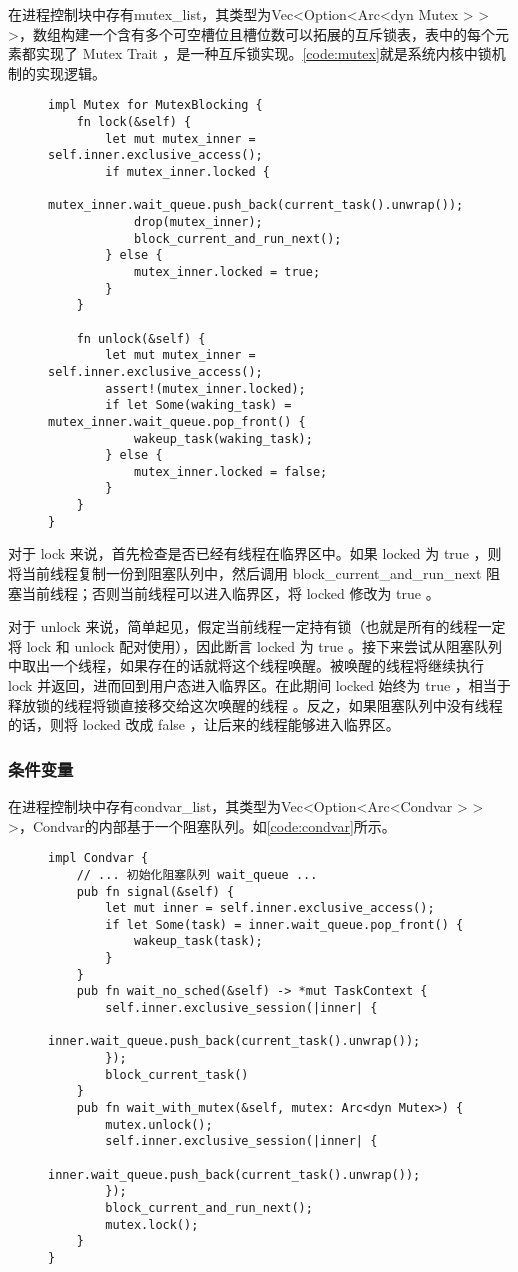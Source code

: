 在进程控制块中存有mutex\_list，其类型为Vec<Option<Arc<dyn Mutex > > >，数组构建一个含有多个可空槽位且槽位数可以拓展的互斥锁表，表中的每个元素都实现了 Mutex Trait ，是一种互斥锁实现。\autoref{code:mutex}就是系统内核中锁机制的实现逻辑。
\begin{figure}[h]
\begin{lstlisting}[caption=互斥锁的实现,label=code:mutex]
impl Mutex for MutexBlocking {
    fn lock(&self) {
        let mut mutex_inner = self.inner.exclusive_access();
        if mutex_inner.locked {
            mutex_inner.wait_queue.push_back(current_task().unwrap());
            drop(mutex_inner);
            block_current_and_run_next();
        } else {
            mutex_inner.locked = true;
        }
    }

    fn unlock(&self) {
        let mut mutex_inner = self.inner.exclusive_access();
        assert!(mutex_inner.locked);
        if let Some(waking_task) = mutex_inner.wait_queue.pop_front() {
            wakeup_task(waking_task);
        } else {
            mutex_inner.locked = false;
        }
    }
}
\end{lstlisting}
\end{figure}

对于 lock 来说，首先检查是否已经有线程在临界区中。如果 locked 为 true ，则将当前线程复制一份到阻塞队列中，然后调用 block\_current\_and\_run\_next 阻塞当前线程；否则当前线程可以进入临界区，将 locked 修改为 true 。

对于 unlock 来说，简单起见，假定当前线程一定持有锁（也就是所有的线程一定将 lock 和 unlock 配对使用），因此断言 locked 为 true 。接下来尝试从阻塞队列中取出一个线程，如果存在的话就将这个线程唤醒。被唤醒的线程将继续执行 lock 并返回，进而回到用户态进入临界区。在此期间 locked 始终为 true ，相当于 释放锁的线程将锁直接移交给这次唤醒的线程 。反之，如果阻塞队列中没有线程的话，则将 locked 改成 false ，让后来的线程能够进入临界区。


\subsubsection{条件变量}

在进程控制块中存有condvar\_list，其类型为Vec<Option<Arc<Condvar > > >，Condvar的内部基于一个阻塞队列。如\autoref{code:condvar}所示。
\begin{figure}[h]
\begin{lstlisting}[caption=条件变量的实现, label=code:condvar]
impl Condvar {
    // ... 初始化阻塞队列 wait_queue ...
    pub fn signal(&self) {
        let mut inner = self.inner.exclusive_access();
        if let Some(task) = inner.wait_queue.pop_front() {
            wakeup_task(task);
        }
    }
    pub fn wait_no_sched(&self) -> *mut TaskContext {
        self.inner.exclusive_session(|inner| {
            inner.wait_queue.push_back(current_task().unwrap());
        });
        block_current_task()
    }
    pub fn wait_with_mutex(&self, mutex: Arc<dyn Mutex>) {
        mutex.unlock();
        self.inner.exclusive_session(|inner| {
            inner.wait_queue.push_back(current_task().unwrap());
        });
        block_current_and_run_next();
        mutex.lock();
    }
}
\end{lstlisting}
\end{figure}

